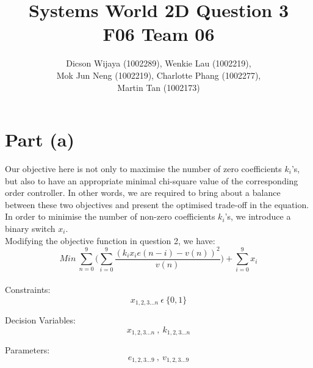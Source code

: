 \documentclass[12pt,a4paper]{article}
\author{Dicson Wijaya (1002289), Wenkie Lau (1002219), \\ Mok Jun Neng (1002219), Charlotte Phang (1002277), \\ Martin Tan (1002173)}
\title{Systems World 2D Question 3\\ F06 Team 06}
\begin{document}
	
	\maketitle
	
	\section{Part (a)}
	Our objective here is not only to maximise the number of zero coefficients $k_i$'s, but also to have an appropriate minimal chi-square value of the corresponding order controller. In other words, we are required to bring about a balance between these two objectives and present the optimised trade-off in the equation. \\
	
	In order to minimise the number of non-zero coefficients $k_i$'s, we introduce a binary switch $x_i$. \\
	
	Modifying the objective function in question 2, we have: $$Min \ \sum_{n=0}^{9} \bigg( \sum_{i=0}^{9} \frac{(k_i x_i e(n-i) - v(n))^2}{v(n)} \bigg) + \sum_{i=0}^{9} x_i$$ \\
	
	Constraints: $$x_{1,2,3...n} \ \epsilon \ \{ 0,1 \}$$
	
	Decision Variables: $$x_{1,2,3...n} \ , \ k_{1,2,3...n}$$
	
	Parameters: $$e_{1,2,3...9} \ , \ v_{1,2,3...9}$$
	
\end{document}
